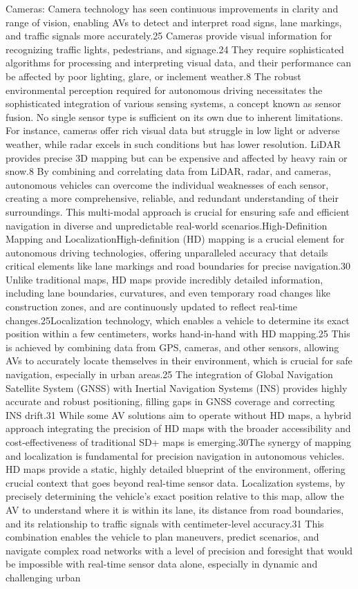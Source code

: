Cameras: Camera technology has seen continuous improvements in clarity and range of vision, enabling AVs to detect and interpret road signs, lane markings, and traffic signals more accurately.25 Cameras provide visual information for recognizing traffic lights, pedestrians, and signage.24 They require sophisticated algorithms for processing and interpreting visual data, and their performance can be affected by poor lighting, glare, or inclement weather.8
The robust environmental perception required for autonomous driving necessitates the sophisticated integration of various sensing systems, a concept known as sensor fusion. No single sensor type is sufficient on its own due to inherent limitations. For instance, cameras offer rich visual data but struggle in low light or adverse weather, while radar excels in such conditions but has lower resolution. LiDAR provides precise 3D mapping but can be expensive and affected by heavy rain or snow.8 By combining and correlating data from LiDAR, radar, and cameras, autonomous vehicles can overcome the individual weaknesses of each sensor, creating a more comprehensive, reliable, and redundant understanding of their surroundings. This multi-modal approach is crucial for ensuring safe and efficient navigation in diverse and unpredictable real-world scenarios.High-Definition Mapping and LocalizationHigh-definition (HD) mapping is a crucial element for autonomous driving technologies, offering unparalleled accuracy that details critical elements like lane markings and road boundaries for precise navigation.30 Unlike traditional maps, HD maps provide incredibly detailed information, including lane boundaries, curvatures, and even temporary road changes like construction zones, and are continuously updated to reflect real-time changes.25Localization technology, which enables a vehicle to determine its exact position within a few centimeters, works hand-in-hand with HD mapping.25 This is achieved by combining data from GPS, cameras, and other sensors, allowing AVs to accurately locate themselves in their environment, which is crucial for safe navigation, especially in urban areas.25 The integration of Global Navigation Satellite System (GNSS) with Inertial Navigation Systems (INS) provides highly accurate and robust positioning, filling gaps in GNSS coverage and correcting INS drift.31 While some AV solutions aim to operate without HD maps, a hybrid approach integrating the precision of HD maps with the broader accessibility and cost-effectiveness of traditional SD+ maps is emerging.30The synergy of mapping and localization is fundamental for precision navigation in autonomous vehicles. HD maps provide a static, highly detailed blueprint of the environment, offering crucial context that goes beyond real-time sensor data. Localization systems, by precisely determining the vehicle's exact position relative to this map, allow the AV to understand where it is within its lane, its distance from road boundaries, and its relationship to traffic signals with centimeter-level accuracy.31 This combination enables the vehicle to plan maneuvers, predict scenarios, and navigate complex road networks with a level of precision and foresight that would be impossible with real-time sensor data alone, especially in dynamic and challenging urban 
